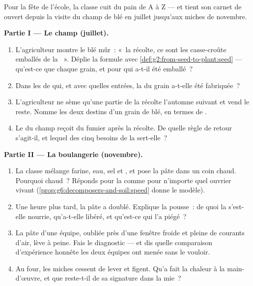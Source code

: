 \begin{problem}\label{pb:g6:producing-our-food:1}
Pour la fête de l'école, la classe cuit du pain de A à Z --- et
tient son carnet de  ouvert depuis la visite du champ de blé
en juillet jusqu'aux miches de novembre.

\medskip\noindent\textbf{Partie I --- Le champ (juillet).}
\begin{enumerate}
  \item L'agriculteur montre le blé mûr~: «~la récolte, ce sont les
        casse-croûte emballés de la ~». Déplie la formule
        avec \cref{def:g2:from-seed-to-plant:seed} --- qu'est-ce
        que chaque grain, et pour qui a-t-il été emballé~?
  \item Dans les  de qui, et avec quelles entrées, la
         du grain a-t-elle été fabriquée~?
  \item L'agriculteur ne sème qu'une partie de la récolte l'automne
        suivant et vend le reste. Nomme les deux destins d'un grain
        de blé, en termes de .
  \item Le  du champ reçoit du fumier après la récolte. De
        quelle règle de retour s'agit-il, et lequel des cinq
        besoins de la  sert-elle~?
\end{enumerate}

\medskip\noindent\textbf{Partie II --- La boulangerie (novembre).}
\begin{enumerate}[resume]
  \item La classe mélange farine, eau, sel et , et pose la
        pâte dans un coin chaud. Pourquoi chaud~? Réponds pour la
         comme pour n'importe quel ouvrier vivant
        (\cref{prop:g6:decomposers-and-soil:speed} donne le
        modèle).
  \item Une heure plus tard, la pâte a doublé. Explique la pousse~:
        de quoi la  s'est-elle nourrie, qu'a-t-elle libéré,
        et qu'est-ce qui l'a piégé~?
  \item La pâte d'une équipe, oubliée près d'une fenêtre froide et
        pleine de courants d'air, lève à peine. Fais le diagnostic
        --- et dis quelle comparaison d'expérience honnête les deux
        équipes ont menée sans le vouloir.
  \item Au four, les miches cessent de lever et figent. Qu'a fait
        la chaleur à la main-d'œuvre, et que reste-t-il de sa
        signature dans la mie~?
\end{enumerate}


\end{problem}
